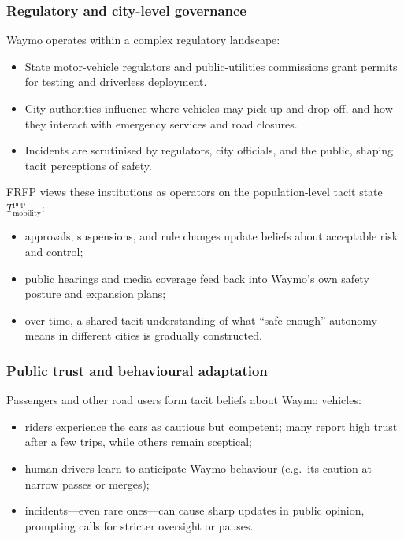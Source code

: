 \subsubsection*{Regulatory and city-level governance}

Waymo operates within a complex regulatory landscape:

\begin{itemize}
  \item State motor-vehicle regulators and public-utilities commissions
        grant permits for testing and driverless deployment.
  \item City authorities influence where vehicles may pick up and drop off,
        and how they interact with emergency services and road closures.
  \item Incidents are scrutinised by regulators, city officials, and the
        public, shaping tacit perceptions of safety.
\end{itemize}

FRFP views these institutions as operators on the population-level tacit
state \(T^{\mathrm{pop}}_{\mathrm{mobility}}\):

\begin{itemize}
  \item approvals, suspensions, and rule changes update beliefs about
        acceptable risk and control;
  \item public hearings and media coverage feed back into Waymo’s own safety
        posture and expansion plans;
  \item over time, a shared tacit understanding of what “safe enough”
        autonomy means in different cities is gradually constructed.
\end{itemize}

\subsubsection*{Public trust and behavioural adaptation}

Passengers and other road users form tacit beliefs about Waymo vehicles:

\begin{itemize}
  \item riders experience the cars as cautious but competent; many report
        high trust after a few trips, while others remain sceptical;
  \item human drivers learn to anticipate Waymo behaviour (e.g.\ its
        caution at narrow passes or merges);
  \item incidents---even rare ones---can cause sharp updates in public
        opinion, prompting calls for stricter oversight or pauses.
\end{itemize}

